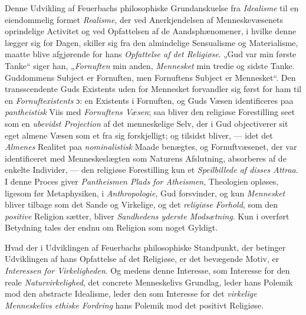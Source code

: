 Denne Udvikling af Feuerbachs philosophiske Grundanskuelse fra
\emph{Idealisme} til en eiendommelig formet \emph{Realisme}, der ved
Anerkjendelsen af Menneskevæsenets oprindelige Activitet og ved Opfattelsen af
de Aandsphænomener, i hvilke denne lægger sig for Dagen, skiller sig fra den
almindelige Sensualisme og Materialisme, maatte blive afgjørende for hans
\emph{Opfattelse af det Religiøse}. „Gud var min første Tanke“ siger han,
„\emph{Fornuften} min anden, \emph{Mennesket} min tredie og sidste Tanke.
Guddommens Subject er Fornuften, men Fornuftens Subject er Mennesket“. Den
transscendente Guds Existents uden for Mennesket forvandler sig først for ham
til en \emph{Fornuftexistents} ɔ: en Existents i Fornuften, og Guds Væsen
identificeres paa \emph{pantheistisk} Viis med \emph{Fornuftens Væsen}; saa
bliver den religiøse Forestilling seet som en \emph{ubevidst Projection} af det
menneskelige Selv, der i Gud objectiverer sit eget almene Væsen som et fra sig
forskjelligt; og tilsidst bliver, --- idet det \emph{Almenes} Realitet paa
\emph{nominalistisk} Maade benægtes, og Fornuftvæsenet, der var identificeret
med Menneskeslægten som Naturens Afslutning, absorberes af de enkelte
Individer, --- den religiøse Forestilling kun et
 \emph{Speilbillede af disses Attraa}. I denne Proces giver \emph{Pantheismen
Plads for Atheismen}, Theologien opløses, ligesom før Metaphysiken, i
\emph{Anthropologie}, Gud forsvinder, og kun \emph{Mennesket} bliver tilbage
som det Sande og Virkelige, og det \emph{religiøse Forhold}, som den
\emph{positive} Religion sætter, bliver \emph{Sandhedens yderste Modsætning}.
Kun i overført Betydning tales der endnu om Religion som noget Gyldigt.

Hvad der i Udviklingen af Feuerbachs philosophiske Standpunkt, der betinger
Udviklingen af hans Opfattelse af det Religiøse, er det bevægende Motiv, er
\emph{Interessen for Virkeligheden}. Og medens denne Interesse, som Interesse
for den reale \emph{Naturvirkelighed}, det concrete Menneskelivs Grundlag,
leder hans Polemik mod den abstracte Idealisme, leder den som Interesse for det
\emph{virkelige Menneskelivs ethiske Fordring} hans Polemik mod det positivt
Religiøse.

